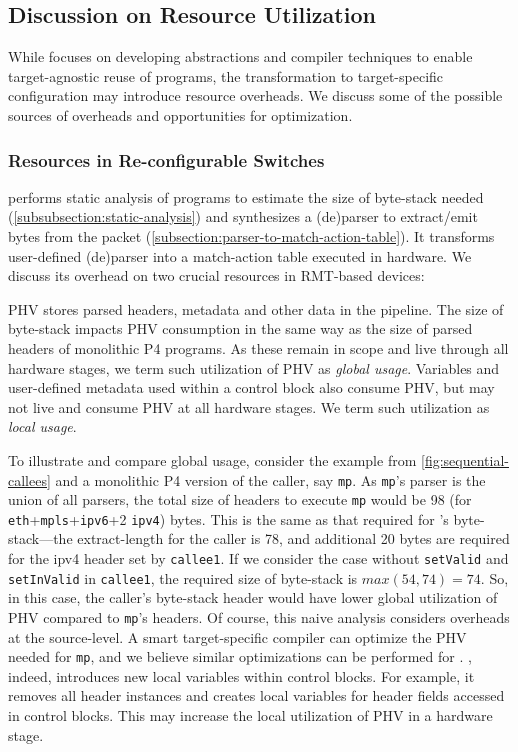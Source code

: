 \documentclass[letterpaper,twocolumn,10pt]{article}
\begin{document}
\subsection{Discussion on Resource Utilization}
\label{sec:overheads}
While \ulang focuses on developing abstractions and compiler
techniques to enable target-agnostic reuse of programs, the
transformation to target-specific configuration may introduce resource
overheads. We discuss some of the possible sources of overheads and
opportunities for optimization.

\subsubsection{Resources in Re-configurable Switches}
\ucomp performs static analysis of \ulang programs to estimate the
size of byte-stack needed (\cref{subsubsection:static-analysis}) and 
synthesizes
a (de)parser to extract/emit bytes from the packet
(\cref{subsection:parser-to-match-action-table}). It transforms
user-defined (de)parser into a match-action table executed in
hardware. We discuss its overhead on two crucial resources in
RMT-based devices:


 PHV stores parsed headers,
metadata and other data in the pipeline. The size of \ulang byte-stack
impacts PHV consumption in the same way as the size of parsed headers
of monolithic P4 programs. As these remain in scope and live through
all hardware stages, we term such utilization of PHV as \emph{global
usage}. Variables and user-defined metadata used within a control
block also consume PHV, but may not live and consume PHV at all
hardware stages. We term such utilization as \emph{local usage}.

To illustrate and compare global usage, consider the example from
\cref{fig:sequential-callees} and a monolithic P4 version of the
caller, say \texttt{mp}. As \texttt{mp}'s parser is the union of all
parsers, the total size of headers to execute \texttt{mp} would be 98
(for \texttt{eth}+\texttt{mpls}+\texttt{ipv6}+2 \texttt{ipv4}) bytes.
This is the same as that required for \ulang's byte-stack---the
extract-length for the caller is 78, and additional 20 bytes are
required for the ipv4 header set by \texttt{callee1}.  If we consider
the case without \texttt{setValid} and \texttt{setInValid} in
\texttt{callee1}, the required size of byte-stack is $max(54, 74) =
74$. So, in this case, the caller's byte-stack header would have lower
global utilization of PHV compared to \texttt{mp}'s headers. Of
course, this naive analysis considers overheads at the source-level. A
smart target-specific compiler can optimize the PHV needed for
\texttt{mp}, and we believe similar optimizations can be performed for
\ulang. \ucomp, indeed, introduces new local variables within control
blocks.  For example, it removes all header instances and creates
local variables for header fields accessed in control blocks. This may
increase the local utilization of PHV in a hardware stage.
\end{document}
